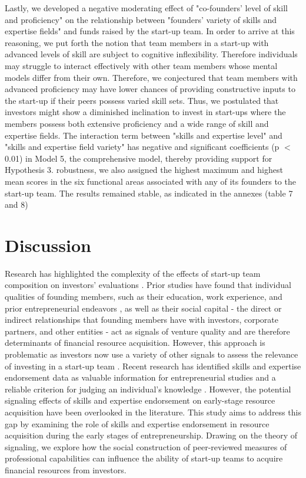 \documentclass[12pt]{article}
\begin{document}
Lastly, we developed a negative moderating effect of "co-founders’ level of skill and proficiency" on the relationship between "founders’ variety of skills and expertise fields" and funds raised by the start-up team. In order to arrive at this reasoning, we put forth the notion that team members in a start-up with advanced levels of skill are subject to cognitive inflexibility. Therefore individuals may struggle to interact effectively with other team members whose mental models differ from their own. Therefore, we conjectured that team members with advanced proficiency may have lower chances of providing constructive inputs to the start-up if their peers possess varied skill sets. Thus, we postulated that investors might show a diminished inclination to invest in start-ups where the members possess both extensive proficiency and a wide range of skill and expertise fields. The interaction term between "skills and expertise level" and "skills and expertise field variety" has negative and significant coefficients (p $<$ 0.01) in Model 5, the comprehensive model, thereby providing support for Hypothesis 3. robustness, we also assigned the highest maximum and highest mean scores in the six functional areas associated with any of its founders to the start-up team. The results remained stable, as indicated in the annexes (table 7 and 8)

\section{Discussion}

Research has highlighted the complexity of the effects of start-up team composition on investors' evaluations \citep{cooper1994initial, ghassemiautomated}. Prior studies have found that individual qualities of founding members, such as their education, work experience, and prior entrepreneurial endeavors \citep{shane2002network, hsu2007experienced}, as well as their social capital - the direct or indirect relationships that founding members have with investors, corporate partners, and other entities \citep{shane2002network, hsu2007experienced, huang2017resources} - act as signals of venture quality and are therefore determinants of financial resource acquisition. However, this approach is problematic as investors now use a variety of other signals to assess the relevance of investing in a start-up team \citep{banerji2019startup, mollick2014dynamics, courtney2017resolving}. Recent research has identified skills and expertise endorsement data \citep{perez2016endorsement, wu2018analysis} as valuable information for entrepreneurial studies and a reliable criterion for judging an individual's knowledge \citep{rapanta2017linkedin, reese2020should, sako2020scaling}. However, the potential signaling effects of skills and expertise endorsement on early-stage resource acquisition have been overlooked in the literature. This study aims to address this gap by examining the role of skills and expertise endorsement in resource acquisition during the early stages of entrepreneurship. Drawing on the theory of signaling, we explore how the social construction of peer-reviewed measures of professional capabilities can influence the ability of start-up teams to acquire financial resources from investors.
\end{document}
